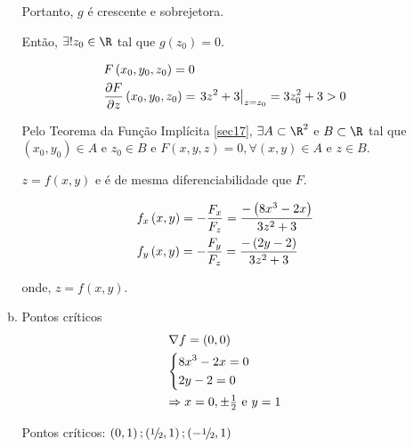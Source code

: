 \documentclass[11pt, oneside, a4paper]{gsm-l}
\begin{document}
\begin{enumerate}
\begin{sol}
\begin{enumerate}[(a)]
        Portanto, $g$ é crescente e sobrejetora.

        Então, $\exists !z_0  \in \R$ tal que $g\left( {z_0 } \right) = 0$.

\[
\begin{gathered}
  F\left( {x_0 ,y_0 ,z_0 } \right) = 0 \hfill \\
  \frac{{\partial F}}
{{\partial z}}\left( {x_0 ,y_0 ,z_0 } \right) = \left. {3z^2  + 3} \right|_{z = z_0 }  = 3z_0^2  + 3 > 0 \hfill \\
\end{gathered}
\]

        Pelo Teorema da Função Implícita \ref{sec17}, $\exists A \subset \R^2$ e $B \subset \R$ tal que $\left( {x_0 ,y_0 } \right) \in A$ e $z_0 \in B$ e $F\left( {x,y,z} \right) = 0,\forall \left( {x,y} \right) \in A$ e $z \in B$.

        $z=f(x,y)$ e é de mesma diferenciabilidade que $F$.

\[
\begin{gathered}
  f_x \left( {x,y} \right) =  - \frac{{F_x }}
{{F_z }} = \frac{{ - \left( {8x^3  - 2x} \right)}}
{{3z^2  + 3}} \hfill \\
  f_y \left( {x,y} \right) =  - \frac{{F_y }}
{{F_z }} = \frac{{ - \left( {2y - 2} \right)}}
{{3z^2  + 3}} \hfill \\
\end{gathered}
\]

        onde, $z=f(x,y)$.

    \item Pontos críticos
\[
\begin{gathered}
  \nabla f = \left( {0,0} \right) \hfill \\
  \left\{ \begin{gathered}
  8x^3  - 2x = 0 \hfill \\
  2y - 2 = 0 \hfill \\
\end{gathered}  \right. \hfill \\
   \Rightarrow x = 0, \pm \tfrac{1}
{2}{\text{ e }}y = 1 \hfill \\
\end{gathered}
\]

        Pontos críticos: $\left( {0,1} \right);\left( {{\raise0.5ex\hbox{$\scriptstyle 1$}\kern-0.1em/\kern-0.15em
\lower0.25ex\hbox{$\scriptstyle 2$}},1} \right);\left( { - {\raise0.5ex\hbox{$\scriptstyle 1$}\kern-0.1em/\kern-0.15em
\lower0.25ex\hbox{$\scriptstyle 2$}},1} \right)$


\end{enumerate}
\end{sol}
\end{enumerate}
\end{document}
